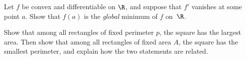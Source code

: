 \begin{exercise}[$\star\star\star$]\label{exo:tle:deriv:8}
Let $f$ be convex and differentiable on $\R$, and suppose that $f'$ vanishes
at some point $a$. Show that $f(a)$ is the \emph{global} minimum of $f$
on~$\R$.
\end{exercise}

\begin{exercise}[$\star\star\star$]\label{exo:tle:deriv:9}
Show that among all rectangles of fixed perimeter $p$, the square has the
largest area. Then show that among all rectangles of fixed area $A$, the
square has the smallest perimeter, and explain how the two statements are
related.
\end{exercise}
